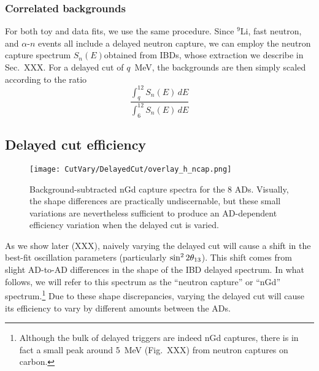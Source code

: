 \documentclass[../thesis.tex]{subfiles}
\begin{document}
\subsubsection{Correlated backgrounds}

For both toy and data fits, we use the same procedure. Since $^9$Li, fast neutron, and $\alpha$-$n$ events all include a delayed neutron capture, we can employ the neutron capture spectrum $S_n(E)$obtained from IBDs, whose extraction we describe in Sec.~XXX. For a delayed cut of $q$~MeV, the backgrounds are then simply scaled according to the ratio
\begin{equation}
  \label{eq:cutVaryDelCutCorrBkgScale}
  \frac{\int_q^{12} S_n(E)\,dE}{\int_6^12 S_n(E)\,dE}
\end{equation}

\subsection{Delayed cut efficiency}
\label{sec:cutVaryDelCutEff}

\begin{figure}[ht]
  \texttt{[image: CutVary/DelayedCut/overlay\_h\_ncap.png]}
  \caption{Background-subtracted nGd capture spectra for the 8 ADs. Visually, the shape differences are practically undiscernable, but these small variations are nevertheless sufficient to produce an AD-dependent efficiency variation when the delayed cut is varied.}
  \label{fig:cutVaryDelCutSpecOverlay}
\end{figure}

As we show later (XXX), naively varying the delayed cut will cause a shift in the best-fit oscillation parameters (particularly $\sin^2 2\theta_{13}$). This shift comes from slight AD-to-AD differences in the shape of the IBD delayed spectrum. In what follows, we will refer to this spectrum as the ``neutron capture'' or ``nGd'' spectrum.\footnote{Although the bulk of delayed triggers are indeed nGd captures, there is in fact a small peak around 5~MeV (Fig.~XXX) from neutron captures on carbon.} Due to these shape discrepancies, varying the delayed cut will cause its efficiency to vary by different amounts between the ADs.
\end{document}
